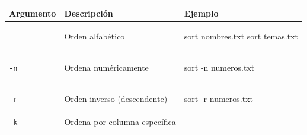 \documentclass[
  spanish,
  12pt,
  letterpaper,
  DIV=11,
  numbers=noendperiod]{scrreprt}
\newenvironment{Shaded}{\begin{snugshade}}{\end{snugshade}}
\newcommand{\AttributeTok}[1]{\textcolor[rgb]{0.40,0.45,0.13}{#1}}
\newcommand{\FunctionTok}[1]{\textcolor[rgb]{0.28,0.35,0.67}{#1}}
\newcommand{\NormalTok}[1]{\textcolor[rgb]{0.00,0.23,0.31}{#1}}
\newcounter{none} %
\begin{document}
{\def\LTcaptype{none} %
\begin{longtable}[]{@{}
  >{\raggedright\arraybackslash}p{}
  >{\raggedright\arraybackslash}p{}
  >{\raggedright\arraybackslash}p{}@{}}
\toprule\noalign{}
\begin{minipage}[b]{\linewidth}\raggedright
Argumento
\end{minipage} & \begin{minipage}[b]{\linewidth}\raggedright
Descripción
\end{minipage} & \begin{minipage}[b]{\linewidth}\raggedright
Ejemplo
\end{minipage} \\
\midrule\noalign{}
\endhead
\bottomrule\noalign{}
\endlastfoot
& Orden alfabético & \begin{minipage}[t]{\linewidth}\raggedright
\begin{Shaded}
\begin{Highlighting}[]
\FunctionTok{sort}\NormalTok{ nombres.txt}
\FunctionTok{sort}\NormalTok{ temas.txt}
\end{Highlighting}
\end{Shaded}
\end{minipage} \\
\texttt{-n} & Ordena numéricamente &
\begin{minipage}[t]{\linewidth}\raggedright
\begin{Shaded}
\begin{Highlighting}[]
\FunctionTok{sort} \AttributeTok{{-}n}\NormalTok{ numeros.txt}
\end{Highlighting}
\end{Shaded}
\end{minipage} \\
\texttt{-r} & Orden inverso (descendente) &
\begin{minipage}[t]{\linewidth}\raggedright
\begin{Shaded}
\begin{Highlighting}[]
\FunctionTok{sort} \AttributeTok{{-}r}\NormalTok{ numeros.txt}
\end{Highlighting}
\end{Shaded}
\end{minipage} \\
\texttt{-k} & Ordena por columna específica &
\begin{minipage}[t]{\linewidth}\raggedright

\end{minipage}
\end{longtable}}
\end{document}
